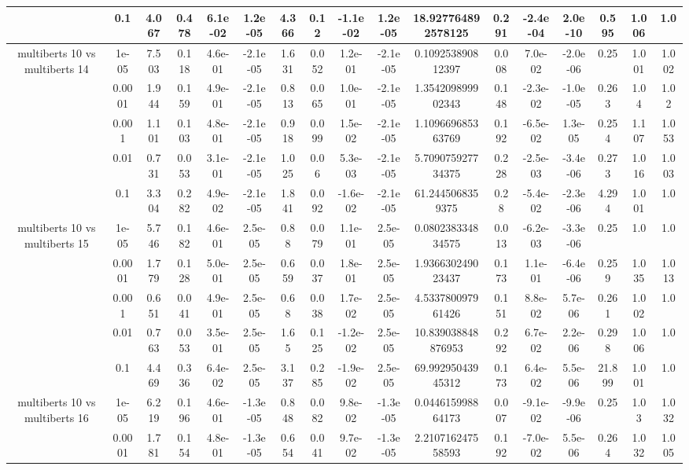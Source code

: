 \begin{tabular}{|c|c|c|c|c|c|c|c|c|c|c|c|c|c|c|c|c|}
 & 0.1 & 4.067 & 0.478 & 6.1e-02 & 1.2e-05 & 4.366 & 0.12 & -1.1e-02 & 1.2e-05 & 18.927764892578125 & 0.291 & -2.4e-04 & 2.0e-10 & 0.595 & 1.006 & 1.0 \\
\hline
\multirow{5}{*}{multiberts 10 vs multiberts 14} & 1e-05 & 7.503 & 0.118 & 4.6e-01 & -2.1e-05 & 1.631 & 0.052 & 1.2e-01 & -2.1e-05 & 0.109253890812397 & 0.008 & 7.0e-02 & -2.0e-06 & 0.25 & 1.001 & 1.002 \\
 & 0.0001 & 1.944 & 0.159 & 4.9e-01 & -2.1e-05 & 0.813 & 0.065 & 1.0e-01 & -2.1e-05 & 1.354209899902343 & 0.148 & -2.3e-02 & -1.0e-05 & 0.263 & 1.04 & 1.02 \\
 & 0.001 & 1.101 & 0.103 & 4.8e-01 & -2.1e-05 & 0.918 & 0.099 & 1.5e-02 & -2.1e-05 & 1.109669685363769 & 0.192 & -6.5e-02 & 1.3e-05 & 0.254 & 1.107 & 1.053 \\
 & 0.01 & 0.731 & 0.053 & 3.1e-01 & -2.1e-05 & 1.025 & 0.06 & 5.3e-03 & -2.1e-05 & 5.709075927734375 & 0.228 & -2.5e-03 & -3.4e-06 & 0.273 & 1.016 & 1.003 \\
 & 0.1 & 3.304 & 0.282 & 4.9e-02 & -2.1e-05 & 1.841 & 0.092 & -1.6e-02 & -2.1e-05 & 61.2445068359375 & 0.28 & -5.4e-02 & -2.3e-06 & 4.294 & 1.001 & 1.0 \\
\hline
\multirow{5}{*}{multiberts 10 vs multiberts 15} & 1e-05 & 5.746 & 0.182 & 4.6e-01 & 2.5e-05 & 0.88 & 0.079 & 1.1e-01 & 2.5e-05 & 0.080238334834575 & 0.013 & -6.2e-03 & -3.3e-06 & 0.25 & 1.0 & 1.0 \\
 & 0.0001 & 1.779 & 0.128 & 5.0e-01 & 2.5e-05 & 0.659 & 0.037 & 1.8e-01 & 2.5e-05 & 1.936630249023437 & 0.173 & 1.1e-01 & -6.4e-06 & 0.259 & 1.035 & 1.013 \\
 & 0.001 & 0.651 & 0.041 & 4.9e-01 & 2.5e-05 & 0.68 & 0.038 & 1.7e-02 & 2.5e-05 & 4.533780097961426 & 0.151 & 8.8e-02 & 5.7e-06 & 0.261 & 1.002 & 1.0 \\
 & 0.01 & 0.763 & 0.053 & 3.5e-01 & 2.5e-05 & 1.65 & 0.125 & -1.2e-02 & 2.5e-05 & 10.839038848876953 & 0.292 & 6.7e-02 & 2.2e-06 & 0.298 & 1.006 & 1.0 \\
 & 0.1 & 4.469 & 0.336 & 6.4e-02 & 2.5e-05 & 3.137 & 0.285 & -1.9e-02 & 2.5e-05 & 69.99295043945312 & 0.173 & 6.4e-02 & 5.5e-06 & 21.899 & 1.001 & 1.0 \\
\hline
\multirow{5}{*}{multiberts 10 vs multiberts 16} & 1e-05 & 6.219 & 0.196 & 4.6e-01 & -1.3e-05 & 0.848 & 0.082 & 9.8e-02 & -1.3e-05 & 0.044615998864173 & 0.007 & -9.1e-02 & -9.9e-06 & 0.25 & 1.03 & 1.032 \\
 & 0.0001 & 1.781 & 0.154 & 4.8e-01 & -1.3e-05 & 0.654 & 0.041 & 9.7e-02 & -1.3e-05 & 2.210716247558593 & 0.192 & -7.0e-02 & 5.5e-06 & 0.264 & 1.032 & 1.005 \\

\end{tabular}
